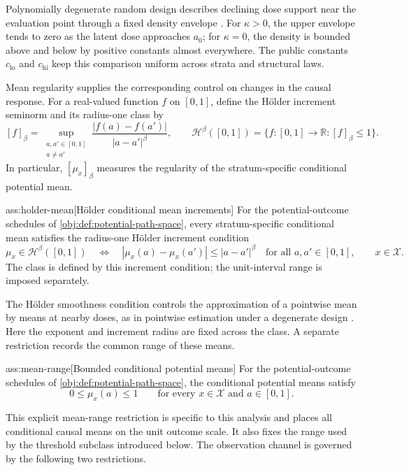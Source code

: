 Polynomially degenerate random design describes declining dose support near the evaluation point through a fixed density envelope \citep{Gaiffas2005}. For \(\kappa>0\), the upper envelope tends to zero as the latent dose approaches \(a_0\); for \(\kappa=0\), the density is bounded above and below by positive constants almost everywhere. The public constants \(c_{\mathrm{lo}}\) and \(c_{\mathrm{hi}}\) keep this comparison uniform across strata and structural laws.

Mean regularity supplies the corresponding control on changes in the causal response. For a real-valued function \(f\) on \([0,1]\), define the Hölder increment seminorm and its radius-one class by
\[
[f]_\beta
=
\sup_{\substack{a,a'\in[0,1]\\a\ne a'}}
\frac{|f(a)-f(a')|}{|a-a'|^\beta},
\qquad
\mathcal H^\beta([0,1])
=
\{f:[0,1]\to\mathbb R:[f]_\beta\le1\}.
\]
In particular, \([\mu_x]_\beta\) measures the regularity of the stratum-specific conditional potential mean.

\begin{assumptionv}{ass:holder-mean}[Hölder conditional mean increments]
For the potential-outcome schedules of \cref{obj:def:potential-path-space}, every stratum-specific conditional mean satisfies the radius-one Hölder increment condition
\[
\mu_x\in\mathcal H^\beta([0,1])
\quad\Longleftrightarrow\quad
|\mu_x(a)-\mu_x(a')|\le |a-a'|^\beta
\quad\text{for all }a,a'\in[0,1],
\qquad x\in\mathcal X.
\]
The class is defined by this increment condition; the unit-interval range is imposed separately.
\end{assumptionv}

The Hölder smoothness condition controls the approximation of a pointwise mean by means at nearby doses, as in pointwise estimation under a degenerate design \citep{Gaiffas2005}. Here the exponent and increment radius are fixed across the class. A separate restriction records the common range of these means.

\begin{assumptionv}{ass:mean-range}[Bounded conditional potential means]
For the potential-outcome schedules of \cref{obj:def:potential-path-space}, the conditional potential means satisfy
\[
0\le\mu_x(a)\le1
\qquad\text{for every }x\in\mathcal X
\text{ and }a\in[0,1].
\]
\end{assumptionv}

This explicit mean-range restriction is specific to this analysis and places all conditional causal means on the unit outcome scale. It also fixes the range used by the threshold subclass introduced below. The observation channel is governed by the following two restrictions.

